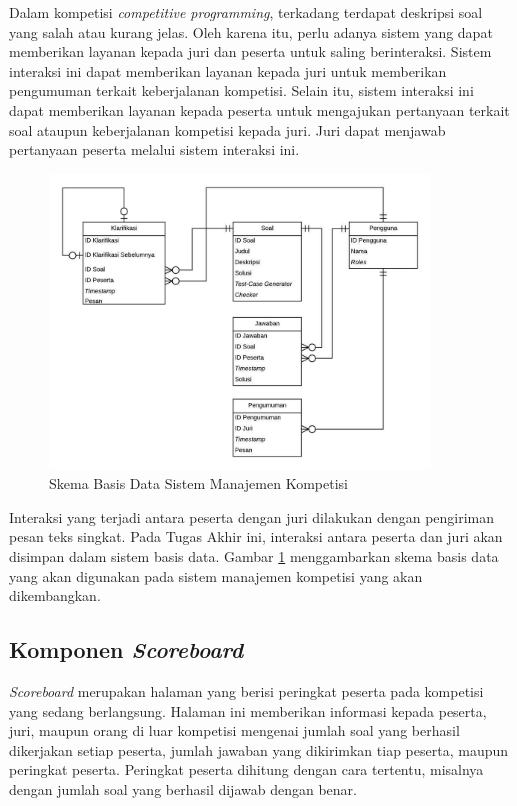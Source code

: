 \par Dalam kompetisi \textit{competitive programming}, terkadang terdapat deskripsi soal yang salah atau kurang jelas. Oleh karena itu, perlu adanya sistem yang dapat memberikan layanan kepada juri dan peserta untuk saling berinteraksi. Sistem interaksi ini dapat memberikan layanan kepada juri untuk memberikan pengumuman terkait keberjalanan kompetisi. Selain itu, sistem interaksi ini dapat memberikan layanan kepada peserta untuk mengajukan pertanyaan terkait soal ataupun keberjalanan kompetisi kepada juri. Juri dapat menjawab pertanyaan peserta melalui sistem interaksi ini.

\begin{figure}[ht!]
    \centering
    \includegraphics[width=0.9\textwidth]{images/oj-erd}
    \caption{Skema Basis Data Sistem Manajemen Kompetisi}
    \label{fig:oj-erd}
\end{figure}

\par Interaksi yang terjadi antara peserta dengan juri dilakukan dengan pengiriman pesan teks singkat. Pada Tugas Akhir ini, interaksi antara peserta dan juri akan disimpan dalam sistem basis data. Gambar \ref{fig:oj-erd} menggambarkan skema basis data yang akan digunakan pada sistem manajemen kompetisi yang akan dikembangkan.

\subsection{Komponen \textit{Scoreboard}}

\par \textit{Scoreboard} merupakan halaman yang berisi peringkat peserta pada kompetisi yang sedang berlangsung. Halaman ini memberikan informasi kepada peserta, juri, maupun orang di luar kompetisi mengenai jumlah soal yang berhasil dikerjakan setiap peserta, jumlah jawaban yang dikirimkan tiap peserta, maupun peringkat peserta. Peringkat peserta dihitung dengan cara tertentu, misalnya dengan jumlah soal yang berhasil dijawab dengan benar.

